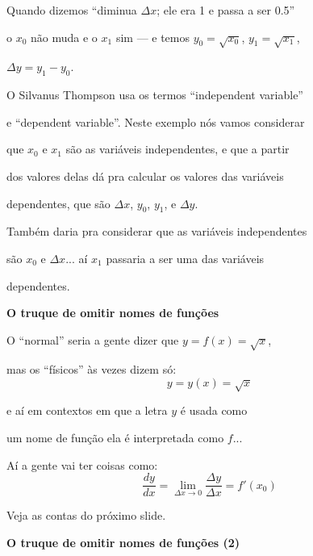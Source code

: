 \documentclass[oneside,12pt]{article}
\begin{document}
Quando dizemos ``diminua $Δx$; ele era 1 e passa a ser 0.5''

o $x_0$ não muda e o $x_1$ sim --- e temos $y_0 = \sqrt{x_0}$, $y_1 = \sqrt{x_1}$,

$Δy = y_1-y_0$.

\msk

O Silvanus Thompson usa os termos ``independent variable''

e ``dependent variable''. Neste exemplo nós vamos considerar

que $x_0$ e $x_1$ são as variáveis independentes, e que a partir

dos valores delas dá pra calcular os valores das variáveis

dependentes, que são $Δx$, $y_0$, $y_1$, e $Δy$.


\msk

Também daria pra considerar que as variáveis independentes

são $x_0$ e $Δx$... aí $x_1$ passaria a ser uma das variáveis

dependentes.


\newpage


{\bf O truque de omitir nomes de funções}

\ssk

O ``normal'' seria a gente dizer que $y = f(x) = \sqrt{x}$,

mas os ``físicos'' às vezes dizem só:
%
$$y = y(x) = \sqrt{x}$$

e aí em contextos em que a letra $y$ é usada como

um nome de função ela é interpretada como $f$...

Aí a gente vai ter coisas como:
%
\def\limdx{\lim_{Δx→0}}
%
$$\frac{dy}{dx} = \limdx \frac{Δy}{Δx} = f'(x_0)$$

Veja as contas do próximo slide.

\newpage


{\bf O truque de omitir nomes de funções (2)}

\vspace*{-0.25cm}
\end{document}
